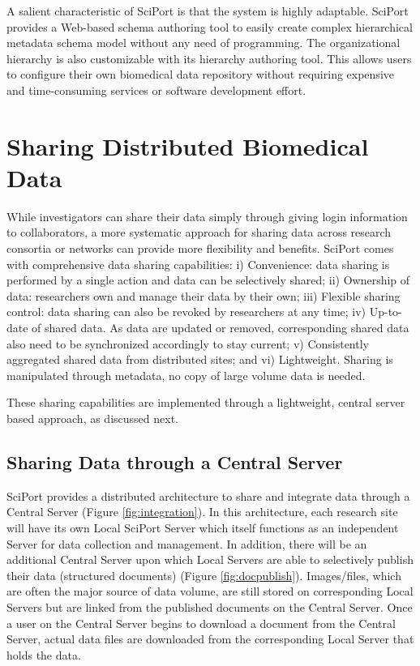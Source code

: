 \documentclass{singlecol-new}
\theoremstyle{TH}{
\newtheorem{lemma}{Lemma}
\newtheorem{theorem}[lemma]{Theorem}
\newtheorem{corrolary}[lemma]{Corrolary}
\newtheorem{conjecture}[lemma]{Conjecture}
\newtheorem{proposition}[lemma]{Proposition}
\newtheorem{claim}[lemma]{Claim}
\newtheorem{stheorem}[lemma]{Wrong Theorem}
\newtheorem{algorithm}{Algorithm}
}
\theoremstyle{THrm}{
\newtheorem{definition}{Definition}[section]
\newtheorem{question}{Question}[section]
\newtheorem{remark}{Remark}
\newtheorem{scheme}{Scheme}
}
\theoremstyle{THhit}{
\newtheorem{case}{Case}[section]
}
\begin{document}
A salient characteristic of SciPort is that the system is highly
adaptable.  SciPort provides a Web-based schema authoring tool to
easily create complex hierarchical metadata schema  model without
any need of programming.  The organizational hierarchy is also
customizable with its hierarchy authoring tool. This allows users to
configure their own biomedical data repository without requiring
expensive and time-consuming services or software development
effort.



\section{Sharing Distributed Biomedical Data} \label{sec:sharing}


While investigators can share their data simply through giving login
information to collaborators, a more systematic approach for sharing
data across research consortia or networks can provide more
flexibility and benefits. SciPort comes with comprehensive data
sharing capabilities: i) Convenience: data sharing is performed by a
single action and data can be selectively shared; ii) Ownership of
data: researchers own and manage their data by their own;  iii)
Flexible sharing control: data sharing can also be revoked by
researchers at any time;  iv) Up-to-date of shared data. As data are
updated or removed, corresponding shared data also need to be
synchronized accordingly to stay current;  v) Consistently
aggregated shared data from distributed sites; and vi) Lightweight.
Sharing is manipulated through metadata, no copy of large volume
data is needed.


These sharing capabilities are implemented through a lightweight,
central server based approach, as discussed next.

\subsection{Sharing Data through a Central Server}


SciPort provides a distributed architecture to share and integrate
data through a Central Server (Figure \ref{fig:integration}). In
this architecture, each research site will have its own Local
SciPort Server which itself functions as an independent Server for
data collection and management. In addition, there will be an
additional Central  Server upon which Local Servers are able to
selectively publish their data (structured documents) (Figure
\ref{fig:docpublish}). Images/files, which are often the major
source of data volume, are still stored on corresponding Local
Servers but are linked from the published documents on the Central
Server. Once a user on the Central Server begins to download a
document from the Central Server, actual data files are downloaded
from the corresponding Local Server that holds the data.
\end{document}
